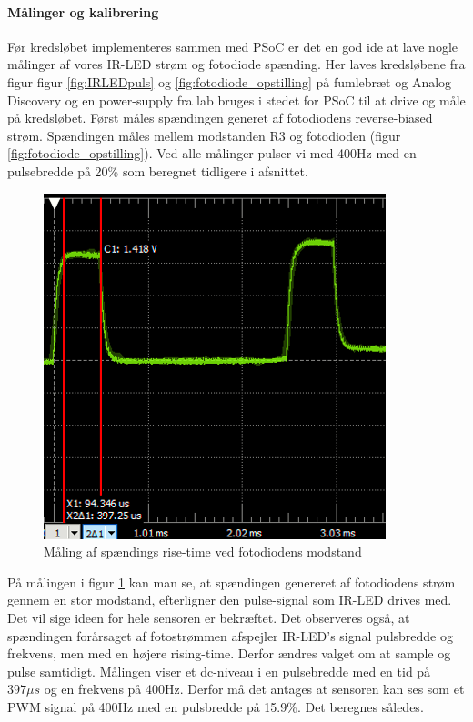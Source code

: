 \documentclass[HardwareDesign/HardwareDesign_main.tex]{subfiles}
\begin{document}
\paragraph{Målinger og kalibrering}
\newline
\newline
Før kredsløbet implementeres sammen med PSoC er det en god ide at lave nogle målinger af vores IR-LED strøm og fotodiode spænding. Her laves kredsløbene fra figur figur \ref{fig:IRLEDpuls} og \ref{fig:fotodiode_opstilling} på fumlebræt og Analog Discovery og en power-supply fra lab bruges i stedet for PSoC til at drive og måle på kredsløbet. Først måles spændingen generet af fotodiodens reverse-biased strøm. Spændingen måles mellem modstanden R3 og fotodioden (figur \ref{fig:fotodiode_opstilling}). Ved alle målinger pulser vi med 400Hz med en pulsebredde på 20\% som beregnet tidligere i afsnittet.
\begin{figure}[H]
    \centering
    \includegraphics{Rapport/BallDispenser/BallCountSensor/graphics/Maling1.png}
    \caption{Måling af spændings rise-time ved fotodiodens modstand}
    \label{fig:Måling1_AD}
\end{figure}
På målingen i figur \ref{fig:Måling1_AD} kan man se, at spændingen genereret af fotodiodens strøm gennem en stor modstand, efterligner den pulse-signal som IR-LED drives med. Det vil sige ideen for hele sensoren er bekræftet. Det observeres også, at spændingen forårsaget af fotostrømmen afspejler IR-LED's signal pulsbredde og frekvens, men med en højere rising-time. Derfor ændres valget om at sample og pulse samtidigt. Målingen viser et dc-niveau i en pulsebredde med en tid på $397\mu s$ og en frekvens på 400Hz. Derfor må det antages at sensoren kan ses som et PWM signal på 400Hz med en pulsbredde på 15.9\%. Det beregnes således.
\end{document}
